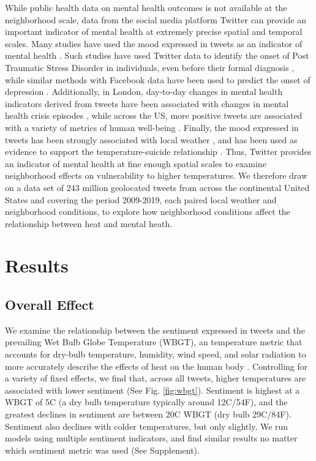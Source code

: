 \documentclass[fleqn,10pt]{wlscirep}
\begin{document}
While public health data on mental health outcomes is not available at the neighborhood scale, data from the social media platform Twitter can provide an important indicator of mental health at extremely precise spatial and temporal scales.  Many studies have used the mood expressed in tweets as an indicator of mental health \cite{Edo-Osagie2020Jul, Sinnenberg2016Dec}.  Such studies have used Twitter data to identify the onset of Post Traumatic Stress Disorder in individuals, even before their formal diagnosis \cite{Reece2017Oct}, while similar methods with Facebook data have been used to predict the onset of depression \cite{Eichstaedt2018Oct}.  Additionally, in London, day-to-day changes in mental health indicators derived from tweets have been associated with changes in mental health crisis episodes \cite{Kolliakou2020Feb}, while across the US, more positive tweets are associated with a variety of metrics of human well-being \cite{Mitchell2013May}.  Finally, the mood expressed in tweets has been strongly associated with local weather \cite{baylis_weather_2018, hannak_tweetin_2012}, and has been used as evidence to support the temperature-suicide relationship \cite{Burke2018Aug}.  Thus, Twitter provides an indicator of mental health at fine enough spatial scales to examine neighborhood effects on vulnerability to higher temperatures.  We therefore draw on a data set of 243 million geolocated tweets from across the continental United States and covering the period 2009-2019, each paired local weather and neighborhood conditions, to explore how neighborhood conditions affect the relationship between heat and mental heath.

\section*{Results}

\subsection*{Overall Effect}
We examine the relationship between the sentiment expressed in tweets and the prevailing Wet Bulb Globe Temperature (WBGT), an temperature metric that accounts for dry-bulb temperature, humidity, wind speed, and solar radiation to more accurately describe the effects of heat on the human body \cite{budd2008wet}.  Controlling for a variety of fixed effects, we find that, across all tweets, higher temperatures are associated with lower sentiment (See Fig. \ref{fig:wbgt}).  Sentiment is highest at a WBGT of 5\textdegree C (a dry bulb temperature typically around 12\textdegree C/54\textdegree F), and the greatest declines in sentiment are between 20\textdegree C WBGT (dry bulb 29\textdegree C/84\textdegree F).  Sentiment also declines with colder temperatures, but only slightly.  We run models using multiple sentiment indicators, and find similar results no matter which sentiment metric was used (See Supplement).
\end{document}
